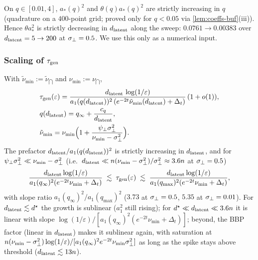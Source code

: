 \begin{remark}\label{rem:astar-mono-buf}
On $q\in[0.01,4]$, $a_*(q)^2$ and $\theta(q)a_*(q)^2$ are strictly increasing in $q$ (quadrature on a $400$-point grid; proved only for $q<0.05$ via \cref{lem:coeffs-buf}(iii)). Hence $\theta a_*^2$ is strictly decreasing in $d_{\mathrm{latent}}$ along the sweep: $0.0761\to0.00383$ over $d_{\mathrm{latent}}=5\to200$ at $\sigma_{\perp}=0.5$. We use this only as a numerical input.
\end{remark}

\subsubsection{Scaling of $\tau_{\mathrm{gen}}$}

\begin{proposition}\label{prop:taugen-buf}
With $\tilde\nu_{\min}:=\tilde\nu_{\dint}$ and $\nu_{\min}:=\nu_{\dint}$,
\begin{equation}\label{eq:taugen-buf}
\begin{aligned}
&\tau_{\mathrm{gen}}(\varepsilon)=\frac{d_{\mathrm{latent}}\,\log(1/\varepsilon)}{a_1(q(d_{\mathrm{latent}}))^2\,(e^{-2t}\tilde\nu_{\min}(d_{\mathrm{latent}})+\Delta_t)}\,(1+o(1)),\\ & q(d_{\mathrm{latent}})=q_\infty+\frac{c_q}{d_{\mathrm{latent}}},\\ & \tilde\nu_{\min}=\nu_{\min}\Bigl(1+\frac{\psi_\perp\sigma_{\perp}^2}{\nu_{\min}-\sigma_{\perp}^2}\Bigr).
\end{aligned}
\end{equation}
The prefactor $d_{\mathrm{latent}}/a_1(q(d_{\mathrm{latent}}))^2$ is strictly increasing in $d_{\mathrm{latent}}$, and for $\psi_\perp\sigma_{\perp}^2\ll\nu_{\min}-\sigma_{\perp}^2$ (i.e.\ $d_{\mathrm{latent}}\ll n(\nu_{\min}-\sigma_{\perp}^2)/\sigma_{\perp}^2\approx3.6n$ at $\sigma_{\perp}=0.5$)
\begin{equation}
\frac{d_{\mathrm{latent}}\log(1/\varepsilon)}{a_1(q_\infty)^2(e^{-2t}\nu_{\min}+\Delta_t)}\;\lesssim\;\tau_{\mathrm{gen}}(\varepsilon)\;\lesssim\;\frac{d_{\mathrm{latent}}\log(1/\varepsilon)}{a_1(q_{\max})^2(e^{-2t}\nu_{\min}+\Delta_t)},
\label{eq:taugen-sandwich-buf}
\end{equation}
with slope ratio $a_1(q_\infty)^2/a_1(q_{\max})^2$ ($3.73$ at $\sigma_{\perp}=0.5$, $5.35$ at $\sigma_{\perp}=0.01$). For $d_{\mathrm{latent}}\lesssim d^\star$ the growth is sublinear ($a_1^2$ still rising); for $d^\star\ll d_{\mathrm{latent}}\ll3.6n$ it is linear with slope $\log(1/\varepsilon)/[a_1(q_\infty)^2(e^{-2t}\nu_{\min}+\Delta_t)]$; beyond, the BBP factor (linear in $d_{\mathrm{latent}}$) makes it sublinear again, with saturation at $n(\nu_{\min}-\sigma_{\perp}^2)\log(1/\varepsilon)/[a_1(q_\infty)^2e^{-2t}\nu_{\min}\sigma_{\perp}^2]$ as long as the spike stays above threshold ($d_{\mathrm{latent}}\lesssim13n$).
\end{proposition}
